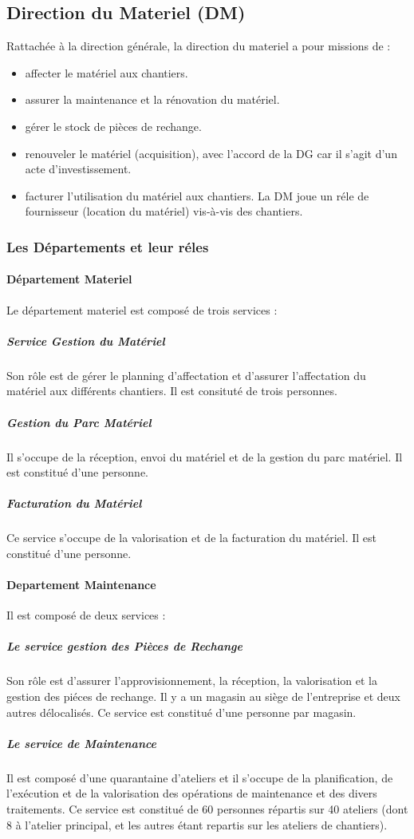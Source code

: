     \subsection{Direction du Materiel (DM)}
            Rattachée à la direction générale, la direction du materiel a pour missions de :
            \begin{itemize}
                \item affecter le matériel aux chantiers.
                \item assurer la maintenance et la rénovation du matériel.
                \item gérer le stock de pièces de rechange.
                \item renouveler le matériel (acquisition), avec l'accord de la DG car il s'agit d'un acte d'investissement.
                \item facturer l'utilisation du matériel aux chantiers. La DM joue un réle de fournisseur (location du matériel) vis-à-vis des chantiers.
            \end{itemize}
            
        \subsubsection{Les Départements et leur réles}
            \paragraph{Département Materiel}
                Le département materiel est composé de trois services :
                \subparagraph{Service Gestion du Matériel}
                    Son rôle est de gérer le planning d'affectation et d'assurer l'affectation du matériel aux différents chantiers. Il est consituté de trois personnes.
                \subparagraph{Gestion du Parc Matériel}
                    Il s'occupe de la réception, envoi du matériel et de la gestion du parc matériel. Il est constitué d'une personne.
                \subparagraph{Facturation du Matériel}
                    Ce service s'occupe de la valorisation et de la facturation du matériel. Il est constitué d'une personne.        
                
            \paragraph{Departement Maintenance}
                Il est composé de deux services :
                \subparagraph{Le service gestion des Pièces de Rechange}
                    Son rôle est d'assurer l'approvisionnement, la réception, la valorisation et la gestion des piéces   de rechange. Il y a un magasin au siège de l'entreprise et deux autres délocalisés. Ce service est constitué d'une personne par magasin. 
                \subparagraph{Le service de Maintenance}
                    Il est composé d'une quarantaine d'ateliers et il s'occupe de la planification, de l'exécution et de la valorisation des opérations de maintenance et des divers traitements. Ce service est constitué de 60 personnes répartis sur 40 ateliers (dont 8 à l'atelier principal, et les autres étant repartis sur les ateliers de chantiers).


